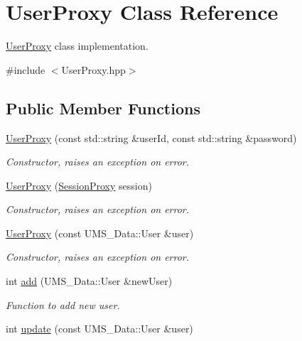 \hypertarget{classUserProxy}{
\section{UserProxy Class Reference}
\label{classUserProxy}
}


\hyperlink{classUserProxy}{UserProxy} class implementation.  




{\ttfamily \#include $<$UserProxy.hpp$>$}

\subsection*{Public Member Functions}
\begin{DoxyCompactItemize}
\item 
\hyperlink{classUserProxy_a651d351f86a03d5fa82b38c071f2e5da}{UserProxy} (const std::string \&userId, const std::string \&password)
\begin{DoxyCompactList}\small\item\em Constructor, raises an exception on error. \item\end{DoxyCompactList}\item 
\hyperlink{classUserProxy_a6a0c05cfa1cebe51b5a7250916e99edd}{UserProxy} (\hyperlink{classSessionProxy}{SessionProxy} session)
\begin{DoxyCompactList}\small\item\em Constructor, raises an exception on error. \item\end{DoxyCompactList}\item 
\hyperlink{classUserProxy_a134b4495a84d5c119e76297b3af504bd}{UserProxy} (const UMS\_\-Data::User \&user)
\begin{DoxyCompactList}\small\item\em Constructor, raises an exception on error. \item\end{DoxyCompactList}\item 
int \hyperlink{classUserProxy_ad1287c55215ec875174bb1168f44a5a6}{add} (UMS\_\-Data::User \&newUser)
\begin{DoxyCompactList}\small\item\em Function to add new user. \item\end{DoxyCompactList}\item 
int \hyperlink{classUserProxy_adcc862d8982f239e0cbe79e55a09d456}{update} (const UMS\_\-Data::User \&user)

\end{DoxyCompactItemize}

